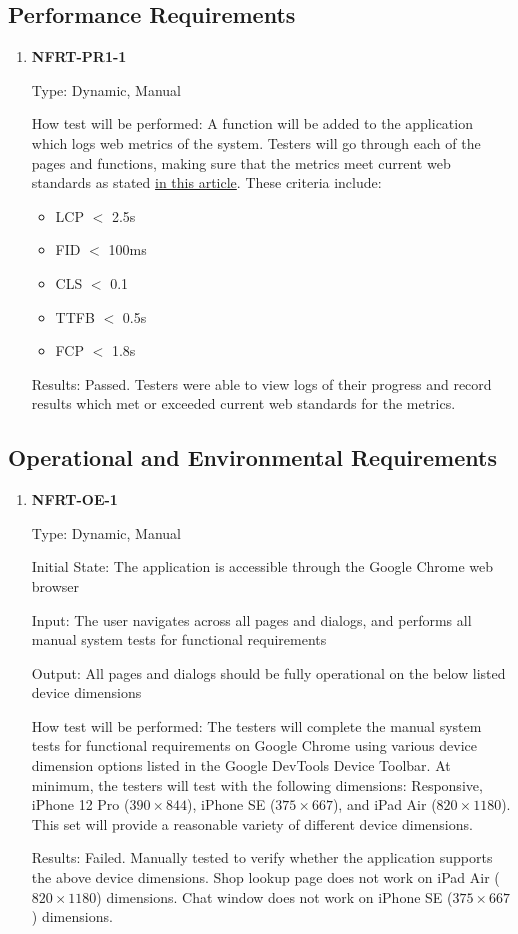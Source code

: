 \documentclass[12pt, titlepage]{article}
\begin{document}
\subsection{Performance Requirements}
\begin{enumerate}
	\item \textbf{NFRT-PR1-1}

	      Type: Dynamic, Manual

	      How test will be performed: A function will be added to the application which logs web metrics of
	      the system. Testers will go through each of the pages and functions, making sure that the metrics
	      meet current web standards as stated \href{https://web.dev/vitals/}{in this article}. These
	      criteria include:
	      \begin{itemize}
		      \item LCP $<$ 2.5s
		      \item FID $<$ 100ms
		      \item CLS $<$ 0.1
		      \item TTFB $<$ 0.5s
		      \item FCP $<$ 1.8s
	      \end{itemize}

	      Results: Passed. Testers were able to view logs of their progress and record results which met or
	      exceeded current web standards for the metrics.

\end{enumerate}

\subsection{Operational and Environmental Requirements}
\begin{enumerate}
	\item \textbf{NFRT-OE-1}

	      Type: Dynamic, Manual

	      Initial State: The application is accessible through the Google Chrome web browser

	      Input: The user navigates across all pages and dialogs, and performs all manual system tests for
	      functional requirements

	      Output: All pages and dialogs should be fully operational on the below listed device dimensions

	      How test will be performed: The testers will complete the manual system tests for functional
	      requirements on Google Chrome using various device dimension options listed in the Google DevTools
	      Device Toolbar. At minimum, the testers will test with the following dimensions: Responsive, iPhone
	      12 Pro ($390 \times 844$), iPhone SE ($375 \times 667$), and iPad Air ($820 \times 1180$). This set
	      will provide a reasonable variety of different device dimensions.

	      Results: Failed. Manually tested to verify whether the application supports the above device
	      dimensions. Shop lookup page does not work on iPad Air ($820 \times 1180$) dimensions. Chat window
	      does not work on iPhone SE ($375 \times 667$) dimensions.
\end{enumerate}
\end{document}
